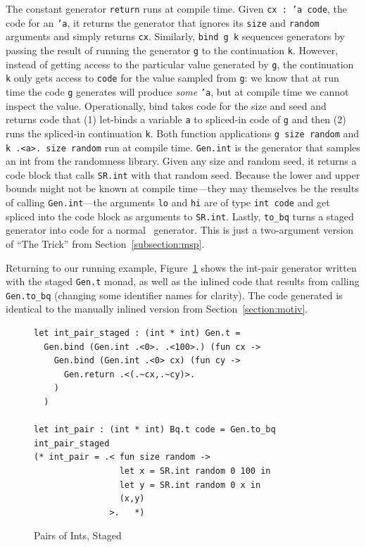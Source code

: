 \documentclass[acmsmall]{acmart}
\newif\ifaftersubmission\aftersubmissionfalse{}
\theoremstyle{definition}
\begin{document}
The constant generator \texttt{return} runs at compile time. Given \texttt{cx : 'a code}, the code for an \texttt{'a}, it
returns the generator that ignores its \texttt{size} and
\texttt{random} arguments and simply returns \texttt{cx}. Similarly,
\texttt{bind g k} sequences generators by passing the result of running the generator \texttt{g} to the continuation \texttt{k}. However, instead of getting access
to the particular value generated by \texttt{g}, the continuation
\texttt{k} only gets access to \texttt{code} for the value sampled from \texttt{g}:
we know that at run time the code \texttt{g} generates will produce \emph{some} \texttt{'a}, but at compile time we cannot inspect the value.
Operationally, bind takes code for the size and seed and returns code that (1) let-binds a variable \texttt{a} to spliced-in code of \texttt{g} and then
(2) runs the spliced-in continuation \texttt{k}.
Both function applications \texttt{g size random}
and \texttt{k .<a>. size random} run at compile time.
\texttt{Gen.int} is the generator that samples an int from the randomness library.
Given any size and random seed, it returns a code block that calls \texttt{SR.int} with that random seed. Because the lower and upper bounds
might not be known at compile time---they may themselves be the results of calling \texttt{Gen.int}---the arguments
\texttt{lo} and \texttt{hi} are of type \texttt{int code} and get spliced into the code block as arguments to \texttt{SR.int}.
Lastly, \texttt{to\_bq} turns a staged generator into code for a normal \bq\
generator. This is just a two-argument version of ``The Trick''
from Section~\ref{subsection:msp}.
\ifaftersubmission
\hg{TODO: Be really careful with formatting of the above paragraph. It's very
easy for some inline code to get split weirdly over a line break or just be
difficult to parse in general, and that could throw the reader off when the
content is already pretty low-level}
\fi


Returning to our running example, Figure~\ref{fig:running-staged} shows the
int-pair generator written with the staged \texttt{Gen.t} monad, as well as the
inlined code that results from calling \texttt{Gen.to\_bq} (changing some identifier names for clarity).
The code generated is identical to the manually inlined version from Section~\ref{section:motiv}.

\begin{figure}[h]
\begin{lstlisting}
let int_pair_staged : (int * int) Gen.t =
  Gen.bind (Gen.int .<0>. .<100>.) (fun cx ->
    Gen.bind (Gen.int .<0> cx) (fun cy ->
      Gen.return .<(.~cx,.~cy)>.
    )
  )

let int_pair : (int * int) Bq.t code = Gen.to_bq int_pair_staged
(* int_pair = .< fun size random ->
                 let x = SR.int random 0 100 in
                 let y = SR.int random 0 x in
                 (x,y)
               >.   *)
\end{lstlisting}
\caption{Pairs of Ints, Staged}
\label{fig:running-staged}
\end{figure}
\end{document}
